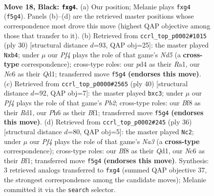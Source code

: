 \documentclass[11pt]{article}
\begin{document}
\clearpage

\begin{figure}[p]\centering
\begin{subfigure}{0.46\textwidth}\centering
\resizebox{\linewidth}{!}{%
\newchessgame
\chessboard[
  setfen={r1q2b1r/p3kpp1/2n2n1p/5p1P/B2P1PP1/8/8/R1BQK1NR b KQ - 0 18},
  showmover=false,
  pgfstyle=straightmove, color=movearrow, markmove={f5-g4}
]}
\caption{}
\end{subfigure}\hfill
\begin{subfigure}{0.46\textwidth}\centering
\resizebox{\linewidth}{!}{%
\newchessgame
\chessboard[
  setfen={1rbqk2r/5ppp/p2p4/3Np1b1/pn2P3/2P5/1P3PPP/R2QKB1R w KQk - 0 16},
  showmover=false,
  pgfstyle=straightmove, color=movearrow, markmove={d5-b4}
]}
\caption{}
\end{subfigure}
\\[4pt]
\begin{subfigure}{0.46\textwidth}\centering
\resizebox{\linewidth}{!}{%
\newchessgame
\chessboard[
  setfen={1rb1k2r/2q3p1/p2bpp2/7P/1p1N4/2n1BP2/PPPQ4/1K1R1B1R w k - 1 21},
  showmover=false,
  pgfstyle=straightmove, color=movearrow, markmove={b2-c3}
]}
\caption{}
\end{subfigure}\hfill
\begin{subfigure}{0.46\textwidth}\centering
\resizebox{\linewidth}{!}{%
\newchessgame
\chessboard[
  setfen={2bqk2r/5ppp/p2p4/3Np1b1/R2PP3/N7/1r2KPPP/3Q1B1R w k - 3 19},
  showmover=false,
  pgfstyle=straightmove, color=movearrow, markmove={a3-c2}
]}
\caption{}
\end{subfigure}
\caption{\textbf{Move 18, Black: \texttt{fxg4}.} (a) Our position; Melanie plays \texttt{fxg4} (\texttt{f5g4}). Panels (b)--(d) are the retrieved master positions whose correspondence most drove this move (highest QAP objective among those that transfer to it). (b) Retrieved from \texttt{ccrl\_top\_p0002\#1015} (ply 30) [structural distance $d$=93, QAP obj=25]: the master played \texttt{Nxb4}; under $\mu$ our \emph{Pf4} plays the role of that game's \emph{Nd5} (a \textbf{cross-type} correspondence); cross-type roles: our \emph{p}d4 as their \emph{R}a1, our \emph{N}c6 as their \emph{Q}d1; transferred move \texttt{f5g4} \textbf{(endorses this move)}. (c) Retrieved from \texttt{ccrl\_top\_p0000\#2565} (ply 40) [structural distance $d$=92, QAP obj=7]: the master played \texttt{bxc3}; under $\mu$ our \emph{Pf4} plays the role of that game's \emph{Pb2}; cross-type roles: our \emph{B}f8 as their \emph{R}d1, our \emph{P}h6 as their \emph{B}f1; transferred move \texttt{f5g4} \textbf{(endorses this move)}. (d) Retrieved from \texttt{ccrl\_top\_p0002\#245} (ply 36) [structural distance $d$=80, QAP obj=5]: the master played \texttt{Nc2}; under $\mu$ our \emph{Pf4} plays the role of that game's \emph{Na3} (a \textbf{cross-type} correspondence); cross-type roles: our \emph{B}f8 as their \emph{Q}d1, our \emph{N}c6 as their \emph{B}f1; transferred move \texttt{f5g4} \textbf{(endorses this move)}. Synthesis: 3 retrieved analogs transferred to \texttt{fxg4} (summed QAP objective 37, the strongest correspondence among the candidate moves); Melanie committed it via the \texttt{search} selector.}
\label{fig:thought-m35}
\end{figure}
\end{document}
